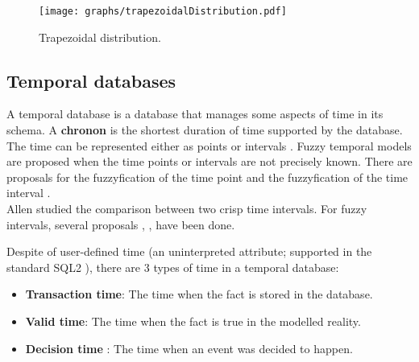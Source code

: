 \documentclass[twoside,twocolumn,a4paper]{article}
\begin{document}
\begin{figure}[h!]
  \centering
  \texttt{[image: graphs/trapezoidalDistribution.pdf]}
  \caption{Trapezoidal distribution.}
  \label{fig:trapezoidal}
\end{figure}



\subsection{\label{subsec:temporal}Temporal databases}
A temporal database \cite{Dyreson1994} is a database that manages some aspects of time in its schema. A \textbf{chronon} is the shortest duration of time supported by the database. The time can be represented either as points or intervals \cite{655777}. Fuzzy temporal models \cite{4481150} are proposed when the time points or intervals are not precisely known. There are proposals for the  fuzzyfication of the time point \cite{Dubois89} and the fuzzyfication of the time interval \cite{Garrido2009}.\\
Allen \cite{Allen:1983:MKT:182.358434} studied the comparison between two crisp time intervals. For fuzzy intervals, several proposals \cite{4481150}, \cite{springerlink:10.1007/978-3-540-39964-3_57},\cite{10.1109/TIME.2004.1314418} have been done.




Despite of user-defined time (an uninterpreted attribute; supported in the standard SQL2 \cite{Mel93}), there are 3 types of time in a temporal database:

\begin{itemize}
	\item
	\textbf{Transaction time}: The time when the fact is stored in the database.
	\item
	\textbf{Valid time}: The time when the fact is true in the modelled reality.
	\item
	\textbf{Decision time} \cite{Nascimento95decisiontime}: The time when an event was decided to happen. 
	\end{itemize}
	
\end{document}

